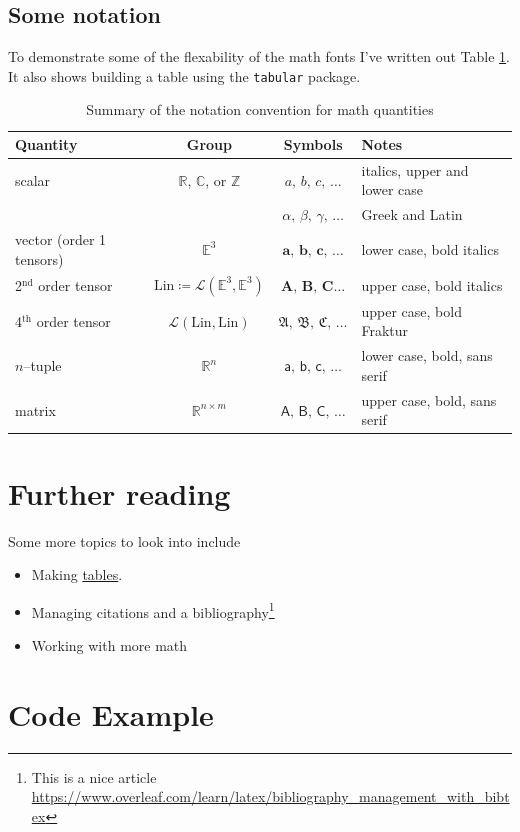 \documentclass[letterpaper,10pt,twoside]{report}
\providecommand\Vec{}
\renewcommand{\Vec}[1]{ \bm{#1} }
\newcommand{\Ten}[1]{ \bm{#1} }
\newcommand{\TenF}[1]{ \bm{\mathfrak{#1}} }
\newcommand{\Col}[1]{ \bm{\mathsf{#1}} }
\begin{document}
\subsection{Some notation}

To demonstrate some of the flexability of the math fonts I've written out Table \ref{tab:notation}.
It also shows building a table using the \texttt{tabular} package.

\vspace{24pt}
\begin{table}[h!]
   \centering
   \caption{Summary of the notation convention for math quantities}
   \label{tab:notation}
\begin{tabular}{lccl}
  \toprule
  \textbf{Quantity} & \textbf{Group} & \textbf{Symbols} & \textbf{Notes}\\
  \midrule
  scalar & $\mathbb{R}$, $\mathbb{C}$, or $\mathbb{Z}$ & $a,\, b,\, c,\, \ldots$ & italics, upper and lower case \\
          &                                             & $\alpha,\, \beta,\, \gamma ,\, \ldots$ & Greek and Latin \\
  \midrule
  vector (order 1 tensors) & $\mathbb{E}^3$ &  $\Vec{a},\, \Vec{b},\, \Vec{c},\, \ldots$ & lower case, bold italics \\
  2${}^\text{nd}$ order tensor & $\text{Lin}\coloneqq \mathcal{L}\left(\mathbb{E}^3,\mathbb{E}^3 \right)$ & $\Ten{A},\, \Ten{B},\, \Ten{C} \ldots$ & upper case, bold italics \\
  4${}^\text{th}$ order tensor & $\mathcal{L}\left(\text{Lin},\text{Lin}\right)$ & $\TenF{A},\, \TenF{B},\, \TenF{C},\, \ldots$ & upper case, bold Fraktur \\
  \midrule
  $n$--tuple & $\mathbb{R}^n$ & $\Col{a},\,\Col{b},\,\Col{c},\, \ldots$ & lower case, bold, sans serif \\
  matrix & $\mathbb{R}^{n\times m}$ & $\Col{A},\,\Col{B},\,\Col{C},\, \ldots$ & upper case, bold, sans serif \\
  \bottomrule
\end{tabular}
\end{table}

\section{Further reading}
Some more topics to look into include
\begin{itemize}
    
    \item Making \href{https://en.wikibooks.org/wiki/LaTeX/Tables}{tables}.

    \item Managing citations and a bibliography\footnote{This is a nice article \url{https://www.overleaf.com/learn/latex/bibliography_management_with_bibtex}}
    
    \item Working with more math

\end{itemize}


\section{Code Example}
\label{sec:code}


\end{document}

